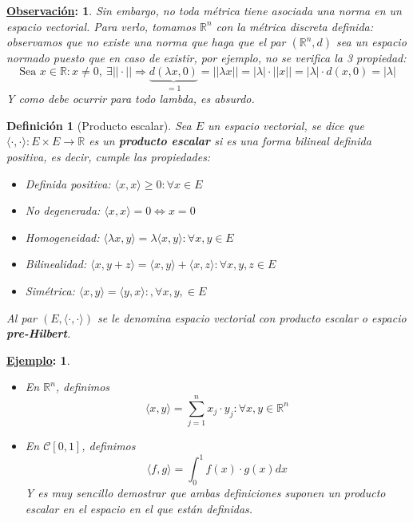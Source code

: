 \documentclass[10pt,a4paper,openright]{book}
\theoremstyle{break}
\newtheorem*{defi}{Definición}
\newtheorem*{obs}{\underline{Observación}:}
\newtheorem*{ej}{\underline{Ejemplo}:}
\begin{document}
\begin{obs}
Sin embargo, no toda métrica tiene asociada una norma en un espacio vectorial. Para verlo, tomamos $\mathbb R^n$ con la métrica discreta definida: observamos que no existe una norma que haga que el par $(\mathbb R^n, d)$ sea un espacio normado puesto que en caso de existir, por ejemplo, no se verifica la 3 propiedad:
$$\mbox{Sea }x\in \mathbb R: x\neq 0, \ \exists ||\cdot||\Rightarrow\underbrace{d(\lambda x , 0)}_{=1} = ||\lambda x|| = |\lambda|\cdot ||x|| = |\lambda| \cdot d(x,0) = |\lambda|$$
Y como debe ocurrir para todo lambda, es absurdo.
\end{obs}

\begin{defi}[Producto escalar]
Sea $E$ un espacio vectorial, se dice que $\langle \cdot, \cdot\rangle: E\times E \rightarrow \mathbb R$ es un \textbf{producto escalar} si es una forma bilineal definida positiva, es decir, cumple las propiedades:
\begin{itemize}
\item Definida positiva: $\langle x,x \rangle \geq 0 : \forall x \in E$
\item No degenerada: $\langle x,x \rangle = 0 \Leftrightarrow x = 0$
\item Homogeneidad: $\langle \lambda x, y \rangle = \lambda \langle x,y\rangle : \forall x, y \in E$
\item Bilinealidad: $\langle x,y+z\rangle = \langle x,y\rangle + \langle x,z\rangle : \forall x, y ,z \in E$
\item Simétrica: $\langle x,y\rangle = \langle y,x\rangle: ,\forall x, y ,\in E$
\end{itemize}
Al par $(E, \langle \cdot, \cdot\rangle)$ se le denomina espacio vectorial con producto escalar o espacio \textbf{pre-Hilbert}.
\end{defi}

\newpage

\begin{ej}
\begin{itemize}
\item En $\mathbb{R}^n$, definimos $$\langle x,y\rangle = \sum_{j=1}^{n} x_j \cdot y_j : \forall x,y \in \mathbb{R}^n$$

\item En $\mathcal{C}[0,1]$, definimos $$\langle f,g \rangle = \int_{0}^{1} f(x) \cdot g(x) dx$$
Y es muy sencillo demostrar que ambas definiciones suponen un producto escalar en el espacio en el que están definidas.
\end{itemize}
\end{ej}
\end{document}

